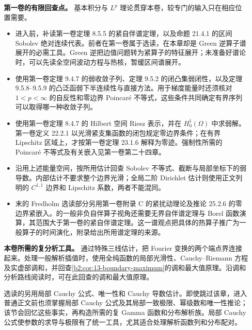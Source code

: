 \ProseParagraphBreak
\noindent\textbf{第一卷的有限回查点。}
基本积分与 \(L^p\) 理论贯穿本卷，较专门的输入只在相应位置需要。
\begin{itemize}
\item 进入前，补读第一卷定理 8.5.5 的紧自伴谱定理，以及命题 21.4.1 的区间 Sobolev 绝对连续代表。前者在第一卷属于选读，在本章却是 Green 逆算子谱展开的必需工具。Green 逆把边值问题转为紧算子的特征展开；未准备好谱论时，可以先读全空间波动方程与热核，暂缓区间谱展开。
\item {}使用第一卷定理 9.4.7 的弱收敛子列、定理 9.5.2 的闭凸集弱闭性，以及定理 9.5.8--9.5.9 的凸泛函弱下半连续性与直接方法。用于梯度能量时还须核对 \(1<p<\infty\) 的自反性和零边界 Poincaré 不等式，这些条件共同确定有界序列可以取得哪一种收敛子列。
\item {}使用第一卷定理 8.4.7 的 Hilbert 空间 Riesz 表示，并在 \(H_0^1(\Omega)\) 中求弱解。第一卷定义 22.2.1 以光滑紧支集函数的闭包规定零边界条件；在有界 Lipschitz 区域上，才按第一卷定理 23.1.6 解释为零迹。强制性所需的 Poincaré 不等式及有关嵌入见第一卷第二十四章。
\item {}沿用上述能量空间，按所用估计回查 Sobolev 不等式、截断与局部坐标下的弱导数。内部估计不要求整个边界光滑；全局二阶 Dirichlet 估计则使用正文列明的 \(C^{1,1}\) 边界和 Lipschitz 系数，两者不能混同。
\item {}末的 Fredholm 选读部分另用第一卷附录 C 的紧扰动理论及推论 25.2.6 的零边界紧嵌入。的一般非负自伴算子视角还需要无界自伴谱定理与 Borel 函数演算，其范围大于第一卷的紧自伴谱定理。这一谱观点把具体的热算子推广为一般算子的时间演化，附录给出所用谱定理的来源。
\end{itemize}

\ProseParagraphBreak
\noindent\textbf{本卷所需的复分析工具。}
通过特殊三线估计，把 Fourier 变换的两个端点界连接起来。处理一般解析插值时，使用全纯函数的局部光滑性、Cauchy--Riemann 方程及实虚部调和，并回查\cref{b2:cor:13-boundary-maximum}的调和最大值原理。沿调和分析路线阅读时，可在此回查的调和最大值原理。

\ProseParagraphBreak
选读的另用局部 Cauchy 公式、唯一性和 Cauchy 导数估计。即使跳过该章，进入普通正文前也须掌握局部 Cauchy 公式及其局部一致极限、幂级数和唯一性推论；该节会回忆这些事实，再构造所需的复 Gamma 函数和分布解析族。局部 Cauchy 公式使参数的求导与极限有了统一工具，尤其适合处理解析函数列和分布配对。

